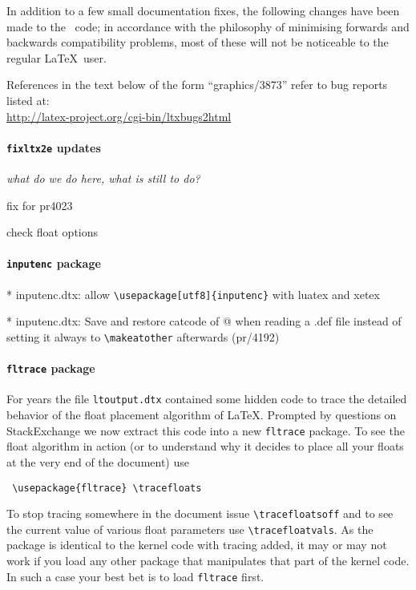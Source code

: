 \documentclass{ltnews}
\begin{document}
In addition to a few small documentation fixes, the following changes
have been made to the \LaTeXe\ code; in accordance with the philosophy
of minimising forwards and backwards compatibility problems, most of
these will not be noticeable to the regular \LaTeX\ user.

References in the text below of the form ``graphics/3873'' refer to
bug reports listed
at:\\ \url{http://latex-project.org/cgi-bin/ltxbugs2html}


\paragraph{\texttt{fixltx2e} updates}

\textit{what do we do here, what is still to do?}

fix for pr4023

check float options


\paragraph{\texttt{inputenc} package}


\begin{itshape}
	* inputenc.dtx: allow \verb=\usepackage[utf8]{inputenc}= with luatex and xetex

	* inputenc.dtx: Save and restore catcode of @ when reading a .def file
	instead of setting it always to \verb=\makeatother= afterwards (pr/4192)

\end{itshape}

\paragraph{\texttt{fltrace} package}

For years the file \texttt{ltoutput.dtx} contained some hidden code to
trace the detailed behavior of the float placement algorithm of
\LaTeX. Prompted by questions on StackExchange we now extract this
code into a new \texttt{fltrace} package. To see the float algorithm
in action (or to understand why it decides to place all your floats at
the very end of the document) use
\begin{verbatim}
 \usepackage{fltrace} \tracefloats
\end{verbatim}
To stop tracing somewhere in the document issue
\verb=\tracefloatsoff= and to see the current value of various float
parameters use \verb=\tracefloatvals=. As the package is identical to
the kernel code with tracing added, it may or may not work if you load any
other package that manipulates that part of the kernel code. In such a
case your best bet is to load \texttt{fltrace} first.
\end{document}
